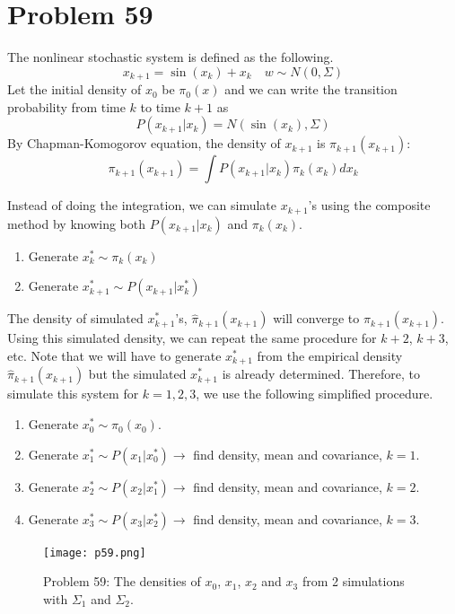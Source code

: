 \documentclass[a4paper, 11pt]{article}
\begin{document}
\section*{Problem 59}

The nonlinear stochastic system is defined as the following. 
\begin{equation}
x_{k+1} = \sin(x_k) + x_k \quad w\sim N(0, \Sigma)
\end{equation}
Let the initial density of $x_0$ be $\pi_0(x)$ and we can write the transition probability from time $k$ to time $k+1$ as 
\begin{equation}
P(x_{k+1}|x_k) = N(\sin(x_k), \Sigma)
\end{equation}
By Chapman-Komogorov equation, the density of $x_{k+1}$ is $\pi_{k+1}(x_{k+1})$:
\begin{equation}
\pi_{k+1}(x_{k+1}) = \int P(x_{k+1}|x_k)\pi_k(x_k)dx_k
\end{equation}

Instead of doing the integration, we can simulate $x_{k+1}$'s using the composite method by knowing both $P(x_{k+1}|x_k)$ and $\pi_k(x_k)$. 
\begin{enumerate}
\item Generate $x_k^* \sim \pi_k(x_k)$ 
\item Generate $x_{k+1}^* \sim P(x_{k+1}|x_k^*)$
\end{enumerate}
The density of simulated $x_{k+1}^*$'s, $\hat{\pi}_{k+1}(x_{k+1})$ will converge to $\pi_{k+1}(x_{k+1})$. Using this simulated density, we can repeat the same procedure for $k+2$, $k+3$, etc. Note that we will have to generate $x_{k+1}^*$ from the empirical density $\hat{\pi}_{k+1}(x_{k+1})$ but the simulated $x_{k+1}^*$ is already determined. Therefore, to simulate this system for $k=1, 2, 3$, we use the following simplified procedure. 
\begin{enumerate}
\item Generate $x_0^* \sim \pi_0(x_0)$.
\item Generate $x_{1}^* \sim P(x_1|x_0^*) \to$ find density, mean and covariance, $k=1$. 
\item Generate $x_{2}^* \sim P(x_2|x_1^*) \to$ find density, mean and covariance, $k=2$.
\item Generate $x_{3}^* \sim P(x_3|x_2^*) \to$ find density, mean and covariance, $k=3$.
\end{enumerate}

\begin{figure}
	\begin{center}
		\texttt{[image: p59.png]}
		\caption{Problem 59: The densities of $x_0$, $x_1$, $x_2$ and $x_3$ from 2 simulations with $\Sigma_1$ and $\Sigma_2$.  } 
	\end{center}
\end{figure}
\end{document}
